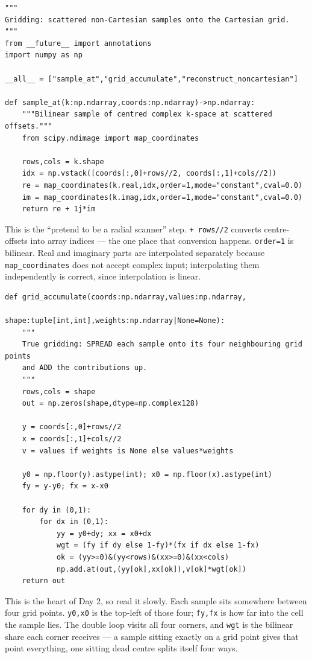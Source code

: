 \documentclass[11pt,a4paper]{article}
\begin{document}
\begin{lstlisting}
"""
Gridding: scattered non-Cartesian samples onto the Cartesian grid.
"""
from __future__ import annotations
import numpy as np

__all__ = ["sample_at","grid_accumulate","reconstruct_noncartesian"]

def sample_at(k:np.ndarray,coords:np.ndarray)->np.ndarray:
    """Bilinear sample of centred complex k-space at scattered offsets."""
    from scipy.ndimage import map_coordinates

    rows,cols = k.shape
    idx = np.vstack([coords[:,0]+rows//2, coords[:,1]+cols//2])
    re = map_coordinates(k.real,idx,order=1,mode="constant",cval=0.0)
    im = map_coordinates(k.imag,idx,order=1,mode="constant",cval=0.0)
    return re + 1j*im
\end{lstlisting}

This is the ``pretend to be a radial scanner'' step. \texttt{+ rows//2} converts
centre-offsets into array indices --- the one place that conversion happens.
\texttt{order=1} is bilinear. Real and imaginary parts are interpolated
separately because \texttt{map\_coordinates} does not accept complex input;
interpolating them independently is correct, since interpolation is linear.

\begin{lstlisting}
def grid_accumulate(coords:np.ndarray,values:np.ndarray,
                    shape:tuple[int,int],weights:np.ndarray|None=None):
    """
    True gridding: SPREAD each sample onto its four neighbouring grid points
    and ADD the contributions up.
    """
    rows,cols = shape
    out = np.zeros(shape,dtype=np.complex128)

    y = coords[:,0]+rows//2
    x = coords[:,1]+cols//2
    v = values if weights is None else values*weights

    y0 = np.floor(y).astype(int); x0 = np.floor(x).astype(int)
    fy = y-y0; fx = x-x0

    for dy in (0,1):
        for dx in (0,1):
            yy = y0+dy; xx = x0+dx
            wgt = (fy if dy else 1-fy)*(fx if dx else 1-fx)
            ok = (yy>=0)&(yy<rows)&(xx>=0)&(xx<cols)
            np.add.at(out,(yy[ok],xx[ok]),v[ok]*wgt[ok])
    return out
\end{lstlisting}

This is the heart of Day 2, so read it slowly. Each sample sits somewhere between
four grid points. \texttt{y0,x0} is the top-left of those four; \texttt{fy,fx} is
how far into the cell the sample lies. The double loop visits all four corners,
and \texttt{wgt} is the bilinear share each corner receives --- a sample sitting
exactly on a grid point gives that point everything, one sitting dead centre
splits itself four ways.
\end{document}
